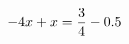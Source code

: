 \documentclass[preview]{standalone}
\begin{document}
\begin{align*}
\special{dvisvgm:raw <g id='unique000'>}- 4 x + x = \frac{3}{4} - 0.5\special{dvisvgm:raw </g>}
\end{align*}
\end{document}
